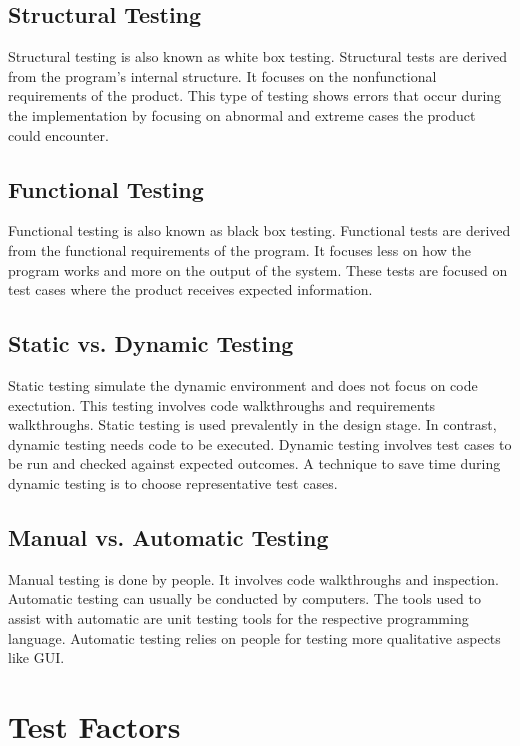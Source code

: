 \documentclass[12pt]{article}
\begin{document}
\subsection{Structural Testing}
Structural testing  is also known as white box testing. Structural tests are derived from the program's internal structure. It focuses on the nonfunctional requirements of the product. This type of testing shows errors that occur during the implementation by focusing on abnormal and extreme cases the product could encounter.
\subsection{Functional Testing}
Functional testing is also known as black box testing. Functional tests are derived from the functional requirements of the program. It focuses less on how the program works and more on the output of the system. These tests are focused on test cases where the product receives expected information.
\subsection{Static vs. Dynamic Testing}
Static testing simulate the dynamic environment and does not focus on code exectution. This testing involves code walkthroughs and requirements walkthroughs. Static testing is used prevalently in the design stage. In contrast, dynamic testing needs code to be executed. \newline\newline
Dynamic testing involves test cases to be run and checked against expected outcomes. A technique to save time during dynamic testing is to choose representative test cases. 
\subsection{Manual vs. Automatic Testing}
Manual testing is done by people. It involves code walkthroughs and inspection. \newline\newline
Automatic testing can usually be conducted by computers. The tools used to assist with automatic are unit testing tools for the respective programming language. Automatic testing relies on people for testing more qualitative aspects like GUI. 

\section{Test Factors}
\end{document}
